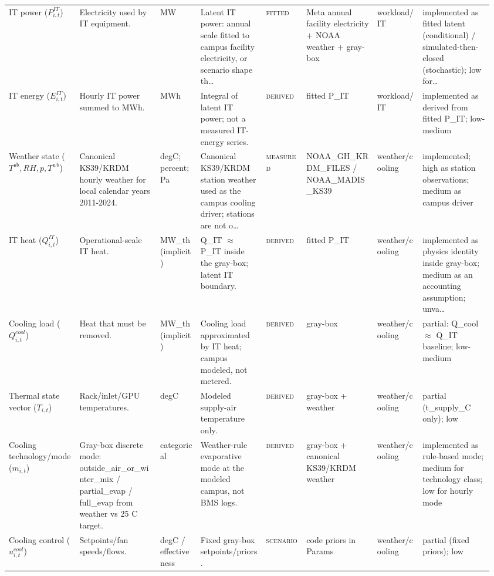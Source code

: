 \documentclass[11pt]{article}
\newcommand{\Measured}{\textsc{measured}}
\newcommand{\Derived}{\textsc{derived}}
\newcommand{\Fitted}{\textsc{fitted}}
\newcommand{\Scenario}{\textsc{scenario}}
\begin{document}
\begin{longtable}{@{}p{0.14\linewidth}p{0.16\linewidth}p{0.08\linewidth}p{0.13\linewidth}p{0.08\linewidth}p{0.14\linewidth}p{0.09\linewidth}p{0.14\linewidth}@{}}
IT power ($P^{IT}_{i,t}$) & Electricity used by IT equipment. & MW & Latent IT power: annual scale fitted to campus facility electricity, or scenario shape th\ldots & \Fitted{} & Meta annual facility electricity + NOAA weather + gray-box & workload/IT & implemented as fitted latent (conditional) / simulated-then-closed (stochastic); low for\ldots\\
IT energy ($E^{IT}_{i,t}$) & Hourly IT power summed to MWh. & MWh & Integral of latent IT power; not a measured IT-energy series. & \Derived{} & fitted P\_IT & workload/IT & implemented as derived from fitted P\_IT; low-medium\\
Weather state ($T^{db}, RH, p, T^{wb}$) & Canonical KS39/KRDM hourly weather for local calendar years 2011-2024. & degC; percent; Pa & Canonical KS39/KRDM station weather used as the campus cooling driver; stations are not o\ldots & \Measured{} & NOAA\_GH\_KRDM\_FILES / NOAA\_MADIS\_KS39 & weather/cooling & implemented; high as station observations; medium as campus driver\\
IT heat ($Q^{IT}_{i,t}$) & Operational-scale IT heat. & MW\_th (implicit) & Q\_IT $\approx$ P\_IT inside the gray-box; latent IT boundary. & \Derived{} & fitted P\_IT & weather/cooling & implemented as physics identity inside gray-box; medium as an accounting assumption; unva\ldots\\
Cooling load ($Q^{cool}_{i,t}$) & Heat that must be removed. & MW\_th (implicit) & Cooling load approximated by IT heat; campus modeled, not metered. & \Derived{} & gray-box & weather/cooling & partial: Q\_cool $\approx$ Q\_IT baseline; low-medium\\
Thermal state vector ($T_{i,t}$) & Rack/inlet/GPU temperatures. & degC & Modeled supply-air temperature only. & \Derived{} & gray-box + weather & weather/cooling & partial (t\_supply\_C only); low\\
Cooling technology/mode ($m_{i,t}$) & Gray-box discrete mode: outside\_air\_or\_winter\_mix / partial\_evap / full\_evap from weather vs 25 C target. & categorical & Weather-rule evaporative mode at the modeled campus, not BMS logs. & \Derived{} & gray-box + canonical KS39/KRDM weather & weather/cooling & implemented as rule-based mode; medium for technology class; low for hourly mode\\
Cooling control ($u^{cool}_{i,t}$) & Setpoints/fan speeds/flows. & degC / effectiveness & Fixed gray-box setpoints/priors. & \Scenario{} & code priors in Params & weather/cooling & partial (fixed priors); low\\

\end{longtable}
\end{document}
